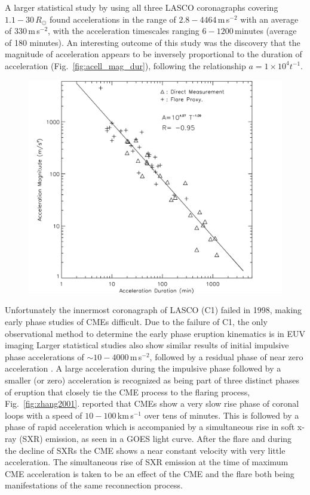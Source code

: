 A larger statistical study by \citep{zhang2006} using all three LASCO coronagraphs covering $1.1-30\,R_{\odot}$ found accelerations in the range of $2.8-4464$\,m\,s$^{-2}$ with an average of 330\,m\,s$^{-2}$, with the acceleration timescales ranging $6-1200$\,minutes (average of 180 minutes). An interesting outcome of this study was the discovery that the magnitude of acceleration appears to be inversely proportional to the duration of acceleration (Fig.~\ref{fig:acell_mag_dur}), following the relationship $a=1\times10^4t^{-1}$.
\begin{figure}[t!]
\begin{center}
\includegraphics[scale=0.3]{images/accel_zhang2006}
\caption{\citep{zhang2006}}
\end{center}
\label{fig:acellmagdur}
\end{figure}
Unfortunately the innermost coronagraph of LASCO (C1) failed in 1998, making early phase studies of CMEs difficult. Due to the failure of C1, the only observational method to determine the early phase eruption kinematics is in EUV imaging
Larger statistical studies also show similar results of initial impulsive phase accelerations of $\sim10-4000$\,m\,s$^{-2}$, followed by a residual phase of near zero acceleration \citep{vrsnak2007, temmer2010}. A large acceleration during the impulsive phase followed by a smaller (or zero) acceleration is recognized as being part of three distinct phases of eruption that closely tie the CME process to the flaring process, Fig.~\ref{fig:zhang2001}. \citet{zhang2001, zhang2004} reported that CMEs show a very slow rise phase of coronal loops with a speed of $10-100$\,km\,s$^{-1}$ over tens of minutes. This is followed by a phase of rapid acceleration which is accompanied by a simultaneous rise in soft x-ray (SXR) emission, as seen in a GOES light curve. After the flare and during the decline of SXRs the CME shows a near constant velocity with very little acceleration. The simultaneous rise of SXR emission at the time of maximum CME acceleration is taken to be an effect of the CME and the flare both being manifestations of the same reconnection process.

